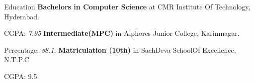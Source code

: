 \begin{rubric}{Education}
\entry*[2020 -- 2024]%
	\textbf{Bachelors in Computer Science} at CMR Institute Of Technology, Hyderabad.
	\par CGPA: \emph{7.95}
%
\entry*[2018 -- 2020]%
	\textbf{Intermediate(MPC)} in Alphores Junior College, Karimnagar.\par
	Percentage: \emph{88.1}.
% 
\entry*[2017 -- 2018]%
	\textbf{Matriculation (10th)} in SachDeva SchoolOf Excellence, N.T.P.C\par
	CGPA: {9.5}.
\end{rubric}
